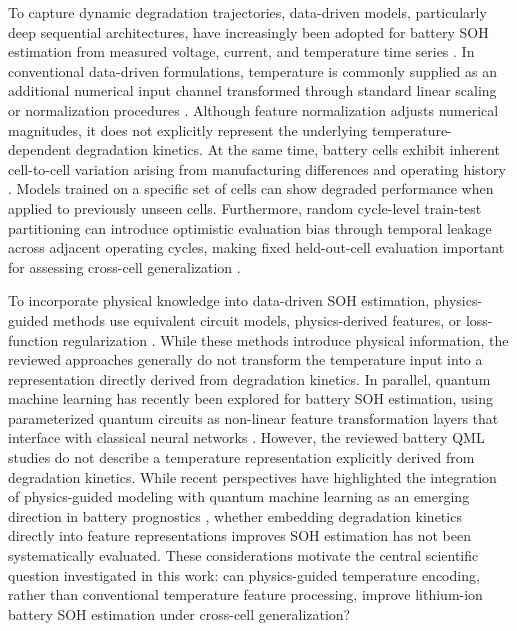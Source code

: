 \documentclass[a4paper,fleqn]{cas-sc}
\begin{document}
To capture dynamic degradation trajectories, data-driven models, particularly deep sequential architectures, have increasingly been adopted for battery SOH estimation from measured voltage, current, and temperature time series \citep{sohtec2024}. In conventional data-driven formulations, temperature is commonly supplied as an additional numerical input channel transformed through standard linear scaling or normalization procedures \citep{zhao2025capacity,tcntransformer2025}. Although feature normalization adjusts numerical magnitudes, it does not explicitly represent the underlying temperature-dependent degradation kinetics. At the same time, battery cells exhibit inherent cell-to-cell variation arising from manufacturing differences and operating history \citep{lu2024mechanisms}. Models trained on a specific set of cells can show degraded performance when applied to previously unseen cells. Furthermore, random cycle-level train-test partitioning can introduce optimistic evaluation bias through temporal leakage across adjacent operating cycles, making fixed held-out-cell evaluation important for assessing cross-cell generalization \citep{sedlavrik2025advanced}.

To incorporate physical knowledge into data-driven SOH estimation, physics-guided methods use equivalent circuit models, physics-derived features, or loss-function regularization \citep{chen2023state,pepe2023}. While these methods introduce physical information, the reviewed approaches generally do not transform the temperature input into a representation directly derived from degradation kinetics. In parallel, quantum machine learning has recently been explored for battery SOH estimation, using parameterized quantum circuits as non-linear feature transformation layers that interface with classical neural networks \citep{komarsofla2026,liang2025stochastic}. However, the reviewed battery QML studies do not describe a temperature representation explicitly derived from degradation kinetics. While recent perspectives have highlighted the integration of physics-guided modeling with quantum machine learning as an emerging direction in battery prognostics \citep{piqml2026}, whether embedding degradation kinetics directly into feature representations improves SOH estimation has not been systematically evaluated. These considerations motivate the central scientific question investigated in this work: can physics-guided temperature encoding, rather than conventional temperature feature processing, improve lithium-ion battery SOH estimation under cross-cell generalization?
\end{document}
